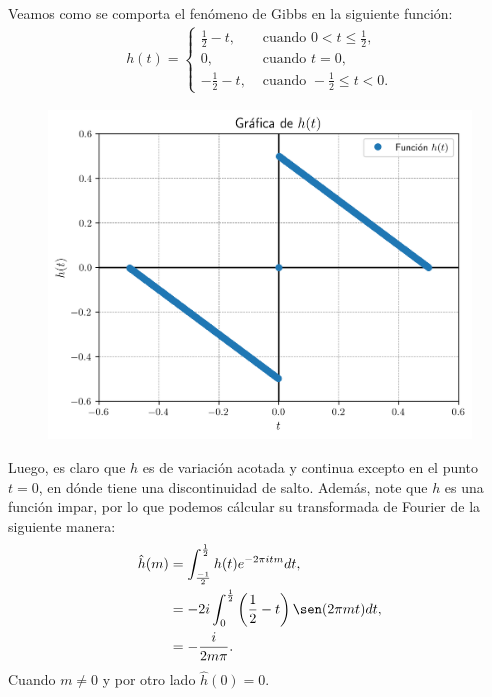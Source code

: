 Veamos como se comporta el fenómeno de Gibbs en la siguiente función:
\begin{align*}
  h(t)= 
  \begin{cases}
    \frac{1}{2}-t, &\text{ cuando } 0<t\leq \frac{1}{2} \text{,} \\
    0, &\text{ cuando } t=0,\\
    -\frac{1}{2}-t, &\text{ cuando }-\frac{1}{2}\leq t<0.
  \end{cases}
\end{align*}
\begin{figure}[H]
\begin{center}
  \includegraphics[scale=0.5]{Figures/h.png}
\end{center}
\end{figure}
Luego, es claro que $h$ es de variación acotada y continua excepto en el punto $t=0$, en dónde tiene una discontinuidad de salto. Además, note que $h$ es una función impar, por lo que podemos cálcular su transformada de Fourier de la siguiente manera:
\begin{equation}\label{eq:h_transformada}
  \begin{split}
    \hat{h}(m)&=\int_{\frac{-1}{2}}^{\frac{1}{2}}h(t)e^{-2\pi itm}dt,\\
    &=-2i \int_{0}^{\frac{1}{2}}\left( \frac{1}{2}-t \right)\sen(2\pi mt)dt,\\
    &=-\frac{i}{2m\pi}.  
  \end{split}
\end{equation}
Cuando $m\neq 0$ y por otro lado $\hat{h}(0)=0$.\\
